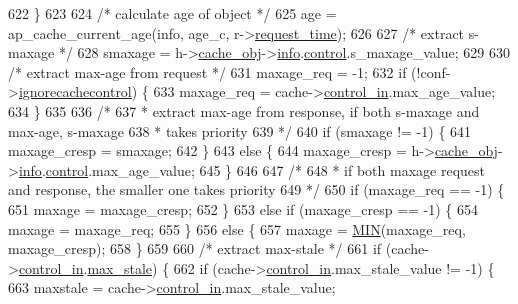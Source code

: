 \begin{DoxyCode}
{622     \}
623 
624     \textcolor{comment}{/* calculate age of object */}
625     age = ap\_cache\_current\_age(info, age\_c, r->\hyperlink{structrequest__rec_a2dadff0630a13ea1ccc2037356ffbb81}{request\_time});
626 
627     \textcolor{comment}{/* extract s-maxage */}
628     smaxage = h->\hyperlink{structcache__handle_aea71e9fd166a32e0fe46a12668a1f3bd}{cache\_obj}->\hyperlink{structcache__object_ab4b2aae3e314dfa7abe8304c33cedb83}{info}.\hyperlink{structcache__info_ad13eba54e179bd5b57b7e97b219b3c67}{control}.s\_maxage\_value;
629 
630     \textcolor{comment}{/* extract max-age from request */}
631     maxage\_req = -1;
632     \textcolor{keywordflow}{if} (!conf->\hyperlink{structcache__server__conf_a2372aa3f5b681975bd629bb1c865735d}{ignorecachecontrol}) \{
633         maxage\_req = cache->\hyperlink{structcache__request__rec_aaea78b272eb05f1ba67a75bd6264b4df}{control\_in}.max\_age\_value;
634     \}
635 
636     \textcolor{comment}{/*}
637 \textcolor{comment}{     * extract max-age from response, if both s-maxage and max-age, s-maxage}
638 \textcolor{comment}{     * takes priority}
639 \textcolor{comment}{     */}
640     \textcolor{keywordflow}{if} (smaxage != -1) \{
641         maxage\_cresp = smaxage;
642     \}
643     \textcolor{keywordflow}{else} \{
644         maxage\_cresp = h->\hyperlink{structcache__handle_aea71e9fd166a32e0fe46a12668a1f3bd}{cache\_obj}->\hyperlink{structcache__object_ab4b2aae3e314dfa7abe8304c33cedb83}{info}.\hyperlink{structcache__info_ad13eba54e179bd5b57b7e97b219b3c67}{control}.max\_age\_value;
645     \}
646 
647     \textcolor{comment}{/*}
648 \textcolor{comment}{     * if both maxage request and response, the smaller one takes priority}
649 \textcolor{comment}{     */}
650     \textcolor{keywordflow}{if} (maxage\_req == -1) \{
651         maxage = maxage\_cresp;
652     \}
653     \textcolor{keywordflow}{else} \textcolor{keywordflow}{if} (maxage\_cresp == -1) \{
654         maxage = maxage\_req;
655     \}
656     \textcolor{keywordflow}{else} \{
657         maxage = \hyperlink{group__Cache__util_ga3acffbd305ee72dcd4593c0d8af64a4f}{MIN}(maxage\_req, maxage\_cresp);
658     \}
659 
660     \textcolor{comment}{/* extract max-stale */}
661     \textcolor{keywordflow}{if} (cache->\hyperlink{structcache__request__rec_aaea78b272eb05f1ba67a75bd6264b4df}{control\_in}.\hyperlink{structcache__control_a86c0c3648dd91f6793e6150fc2fd2391}{max\_stale}) \{
662         \textcolor{keywordflow}{if} (cache->\hyperlink{structcache__request__rec_aaea78b272eb05f1ba67a75bd6264b4df}{control\_in}.max\_stale\_value != -1) \{
663             maxstale = cache->\hyperlink{structcache__request__rec_aaea78b272eb05f1ba67a75bd6264b4df}{control\_in}.max\_stale\_value;
}
\end{DoxyCode}
